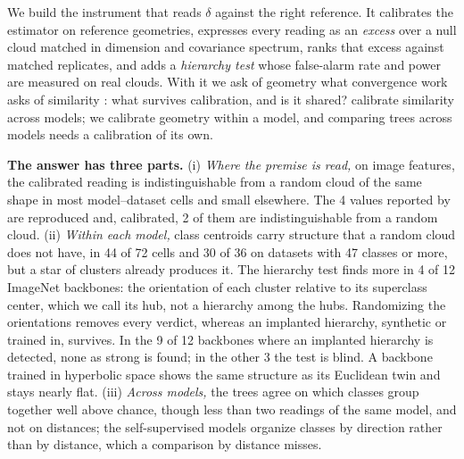 \documentclass{article}
\theoremstyle{inline}
\theoremstyle{inlineit}
\begin{document}
We build the instrument that reads $\delta$ against the right reference. It calibrates the estimator on reference geometries, expresses every reading as an \emph{excess} over a null cloud matched in dimension and covariance spectrum, ranks that excess against matched replicates, and adds a \emph{hierarchy test} whose false-alarm rate and power are measured on real clouds. With it we ask of geometry what convergence work asks of similarity \citep{huh2024platonic, groger2026aristotelian}: what survives calibration, and is it shared? \citet{groger2026aristotelian} calibrate similarity across models; we calibrate geometry within a model, and comparing trees across models needs a calibration of its own.

\textbf{The answer has three parts.} (i) \emph{Where the premise is read,} on image features, the calibrated reading is indistinguishable from a random cloud of the same shape in most model--dataset cells and small elsewhere. The 4 values reported by \citet{Khrulkov_2020_CVPR} are reproduced and, calibrated, 2 of them are indistinguishable from a random cloud. (ii) \emph{Within each model,} class centroids carry structure that a random cloud does not have, in 44 of 72 cells and 30 of 36 on datasets with 47 classes or more, but a star of clusters already produces it. The hierarchy test finds more in 4 of 12 ImageNet backbones: the orientation of each cluster relative to its superclass center, which we call its hub, not a hierarchy among the hubs. Randomizing the orientations removes every verdict, whereas an implanted hierarchy, synthetic or trained in, survives. In the 9 of 12 backbones where an implanted hierarchy is detected, none as strong is found; in the other 3 the test is blind. A backbone trained in hyperbolic space shows the same structure as its Euclidean twin and stays nearly flat. (iii) \emph{Across models,} the trees agree on which classes group together well above chance, though less than two readings of the same model, and not on distances; the self-supervised models organize classes by direction rather than by distance, which a comparison by distance misses.
\end{document}
